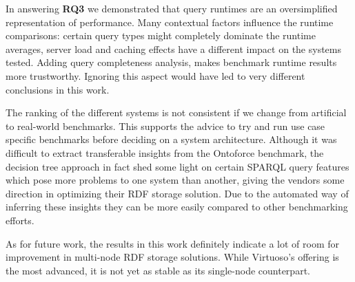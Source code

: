 In answering \textbf{RQ3} we demonstrated that query runtimes are an oversimplified representation of performance. Many contextual factors influence the runtime comparisons: certain query types might completely dominate the runtime averages, server load and caching effects have a different impact on the systems tested. Adding query completeness analysis, makes benchmark runtime results more trustworthy. Ignoring this aspect would have led to very different conclusions in this work.

The ranking of the different systems is not consistent if we change from artificial to real-world benchmarks. This supports the advice to try and run use case specific benchmarks before deciding on a system architecture. Although it was difficult to extract transferable insights from the Ontoforce benchmark, the decision tree approach in fact shed some light on certain SPARQL query features which pose more problems to one system than another, giving the vendors some direction in optimizing their RDF storage solution. Due to the automated way of inferring these insights they can be more easily compared to other benchmarking efforts.

As for future work, the results in this work definitely indicate a lot of room for improvement in multi-node RDF storage solutions. While Virtuoso's offering is the most advanced, it is not yet as stable as its single-node counterpart. 


%


